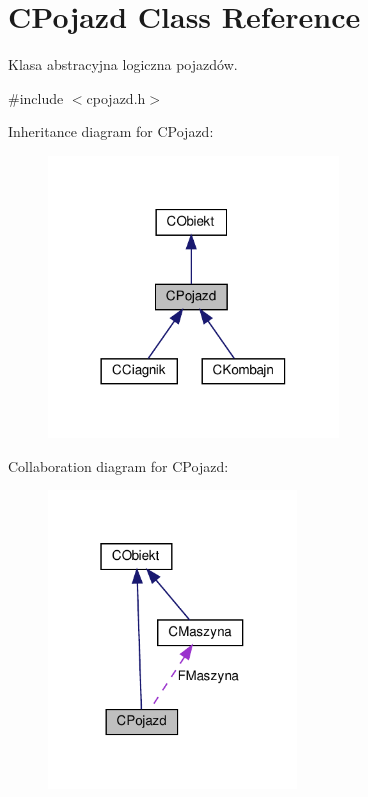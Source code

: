 \hypertarget{class_c_pojazd}{}\section{C\+Pojazd Class Reference}
\label{class_c_pojazd}


Klasa abstracyjna logiczna pojazdów.  




{\ttfamily \#include $<$cpojazd.\+h$>$}



Inheritance diagram for C\+Pojazd\+:\nopagebreak
\begin{figure}[H]
\begin{center}
\leavevmode
\includegraphics[width=218pt]{class_c_pojazd__inherit__graph}
\end{center}
\end{figure}


Collaboration diagram for C\+Pojazd\+:\nopagebreak
\begin{figure}[H]
\begin{center}
\leavevmode
\includegraphics[width=187pt]{class_c_pojazd__coll__graph}
\end{center}
\end{figure}
